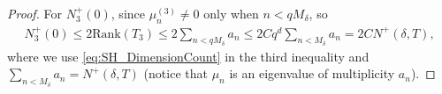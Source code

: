 \begin{proof}
  For $N_3^+(0)$,  since $\mu_{n}^{(3)} \neq 0$ only when $n < qM_\delta$, so
  \begin{align}
    \label{eq:Proof_MainLemma_N3_Bound}
    N_3^+(0) \leq 2 \mathrm{Rank}(T_3) \leq 2 \sum_{n < qM_{\delta}} a_n \leq 2 C q^d \sum_{n < M_{\delta}}a_n = 2 C N^+(\delta,T),
  \end{align}
  where we use \cref{eq:SH_DimensionCount} in the third inequality
  and $\sum_{n < M_{\delta}}a_n = N^+(\delta,T)$ (notice that $\mu_n$ is an eigenvalue of multiplicity $a_n$).




\end{proof}
